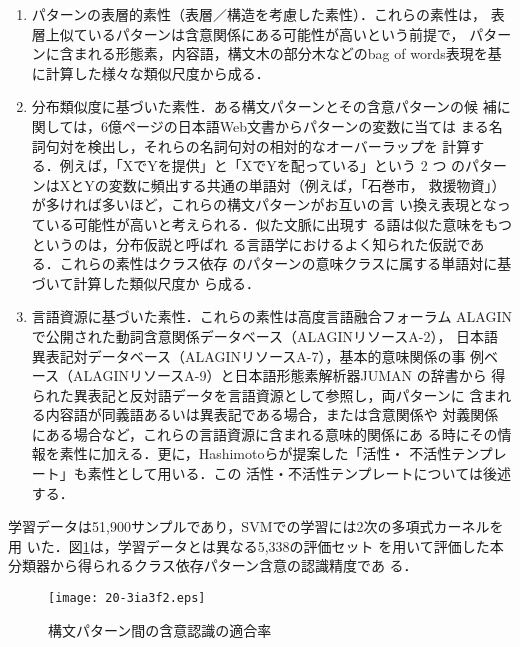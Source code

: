 \documentclass[japanese]{jnlp_1.4}
\begin{document}
\begin{enumerate}
 \item パターンの表層的素性（表層／構造を考慮した素性）．これらの素性は，
       表層上似ているパターンは含意関係にある可能性が高いという前提で，
       パターンに含まれる形態素，内容語，構文木の部分木などのbag of
       words表現を基に計算した様々な類似尺度から成る．
 \item 分布類似度に基づいた素性．ある構文パターンとその含意パターンの候
       補に関しては，6億ページの日本語Web文書からパターンの変数に当ては
       まる名詞句対を検出し，それらの名詞句対の相対的なオーバーラップを
       計算する．例えば，「XでYを提供」と「XでYを配っている」という 2 つ
       のパターンはXとYの変数に頻出する共通の単語対（例えば，「石巻市，
       救援物資」）が多ければ多いほど，これらの構文パターンがお互いの言
       い換え表現となっている可能性が高いと考えられる．似た文脈に出現す
       る語は似た意味をもつというのは，分布仮説\cite{Harris1954}と呼ばれ
       る言語学におけるよく知られた仮説である．これらの素性はクラス依存
       のパターンの意味クラスに属する単語対に基づいて計算した類似尺度か
       ら成る．
 \item 言語資源に基づいた素性．これらの素性は高度言語融合フォーラム
       ALAGIN で公開された動詞含意関係データベース（ALAGINリソースA-2），
       日本語異表記対データベース（ALAGINリソースA-7），基本的意味関係の事
       例ベース（ALAGINリソースA-9）と日本語形態素解析器JUMAN の辞書から
       得られた異表記と反対語データを言語資源として参照し，両パターンに
       含まれる内容語が同義語あるいは異表記である場合，または含意関係や
       対義関係にある場合など，これらの言語資源に含まれる意味的関係にあ
       る時にその情報を素性に加える．更に，Hashimotoらが提案した「活性・
       不活性テンプレート」\cite{Hashimoto2012}も素性として用いる．この
       活性・不活性テンプレートについては後述する．
\end{enumerate}

学習データは51,900サンプルであり，SVMでの学習には2次の多項式カーネルを用
いた．図\ref{entailment_recog}は，学習データとは異なる5,338の評価セット
を用いて評価した本分類器から得られるクラス依存パターン含意の認識精度であ
る．

\begin{figure}[b]
\begin{center}
\texttt{[image: 20-3ia3f2.eps]}
\end{center}
\caption{構文パターン間の含意認識の適合率}
\label{entailment_recog}
\end{figure}
\end{document}
